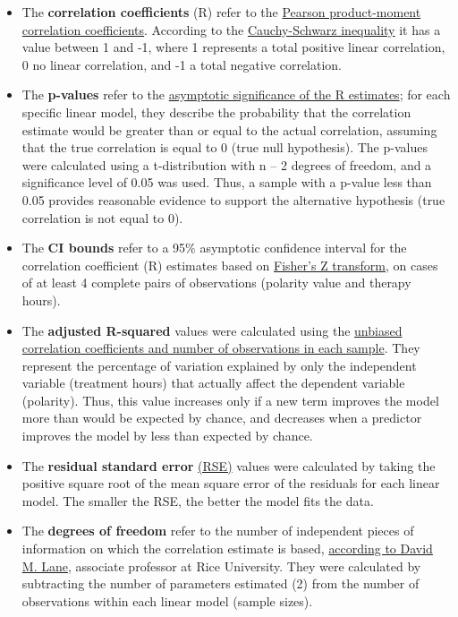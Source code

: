 \documentclass[]{article}
\begin{document}
\begin{itemize}
\item
  The \textbf{correlation coefficients} (R) refer to the
  \href{https://statistics.laerd.com/statistical-guides/pearson-correlation-coefficient-statistical-guide.php}{Pearson
  product-moment correlation coefficients}. According to the
  \href{https://en.wikipedia.org/wiki/Cauchy\%E2\%80\%93Schwarz_inequality}{Cauchy-Schwarz
  inequality} it has a value between 1 and -1, where 1 represents a
  total positive linear correlation, 0 no linear correlation, and -1 a
  total negative correlation.
\item
  The \textbf{p-values} refer to the
  \href{https://en.wikipedia.org/wiki/P-value\#Definition_and_interpretation}{asymptotic
  significance of the R estimates}; for each specific linear model, they
  describe the probability that the correlation estimate would be
  greater than or equal to the actual correlation, assuming that the
  true correlation is equal to 0 (true null hypothesis). The p-values
  were calculated using a t-distribution with n -- 2 degrees of freedom,
  and a significance level of 0.05 was used. Thus, a sample with a
  p-value less than 0.05 provides reasonable evidence to support the
  alternative hypothesis (true correlation is not equal to 0).
\item
  The \textbf{CI bounds} refer to a 95\% asymptotic confidence interval
  for the correlation coefficient (R) estimates based on
  \href{https://en.wikipedia.org/wiki/Fisher_transformation}{Fisher's Z
  transform}, on cases of at least 4 complete pairs of observations
  (polarity value and therapy hours).
\item
  The \textbf{adjusted R-squared} values were calculated using the
  \href{https://www-bcf.usc.edu/~gareth/ISL/ISLR\%20First\%20Printing.pdf\#page=227}{unbiased
  correlation coefficients and number of observations in each sample}.
  They represent the percentage of variation explained by only the
  independent variable (treatment hours) that actually affect the
  dependent variable (polarity). Thus, this value increases only if a
  new term improves the model more than would be expected by chance, and
  decreases when a predictor improves the model by less than expected by
  chance.
\item
  The \textbf{residual standard error}
  \href{http://statweb.stanford.edu/~susan/courses/s60/split/node60.html}{(RSE)}
  values were calculated by taking the positive square root of the mean
  square error of the residuals for each linear model. The smaller the
  RSE, the better the model fits the data.
\item
  The \textbf{degrees of freedom} refer to the number of independent
  pieces of information on which the correlation estimate is based,
  \href{http://onlinestatbook.com/2/estimation/df.html}{according to
  David M. Lane}, associate professor at Rice University. They were
  calculated by subtracting the number of parameters estimated (2) from
  the number of observations within each linear model (sample sizes).
\end{itemize}
\end{document}
